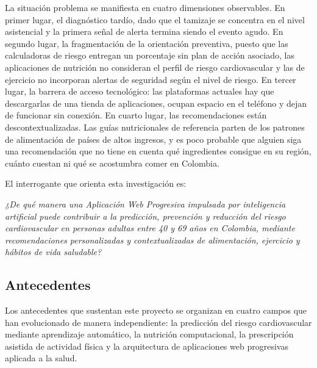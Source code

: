 \documentclass[conference]{IEEEtran}
\begin{document}
La situación problema se manifiesta en cuatro dimensiones observables. En primer lugar, el diagnóstico tardío, dado que el tamizaje se concentra en el nivel asistencial y la primera señal de alerta termina siendo el evento agudo. En segundo lugar, la fragmentación de la orientación preventiva, puesto que las calculadoras de riesgo entregan un porcentaje sin plan de acción asociado, las aplicaciones de nutrición no consideran el perfil de riesgo cardiovascular y las de ejercicio no incorporan alertas de seguridad según el nivel de riesgo. En tercer lugar, la barrera de acceso tecnológico: las plataformas actuales hay que descargarlas de una tienda de aplicaciones, ocupan espacio en el teléfono y dejan de funcionar sin conexión. En cuarto lugar, las recomendaciones están descontextualizadas. Las guías nutricionales de referencia parten de los patrones de alimentación de países de altos ingresos, y es poco probable que alguien siga una recomendación que no tiene en cuenta qué ingredientes consigue en su región, cuánto cuestan ni qué se acostumbra comer en Colombia.

El interrogante que orienta esta investigación es:

\textit{¿De qué manera una Aplicación Web Progresiva impulsada por inteligencia artificial puede contribuir a la predicción, prevención y reducción del riesgo cardiovascular en personas adultas entre 40 y 69 años en Colombia, mediante recomendaciones personalizadas y contextualizadas de alimentación, ejercicio y hábitos de vida saludable?}

\subsection{Antecedentes}
Los antecedentes que sustentan este proyecto se organizan en cuatro campos que han evolucionado de manera independiente: la predicción del riesgo cardiovascular mediante aprendizaje automático, la nutrición computacional, la prescripción asistida de actividad física y la arquitectura de aplicaciones web progresivas aplicada a la salud.
\end{document}
